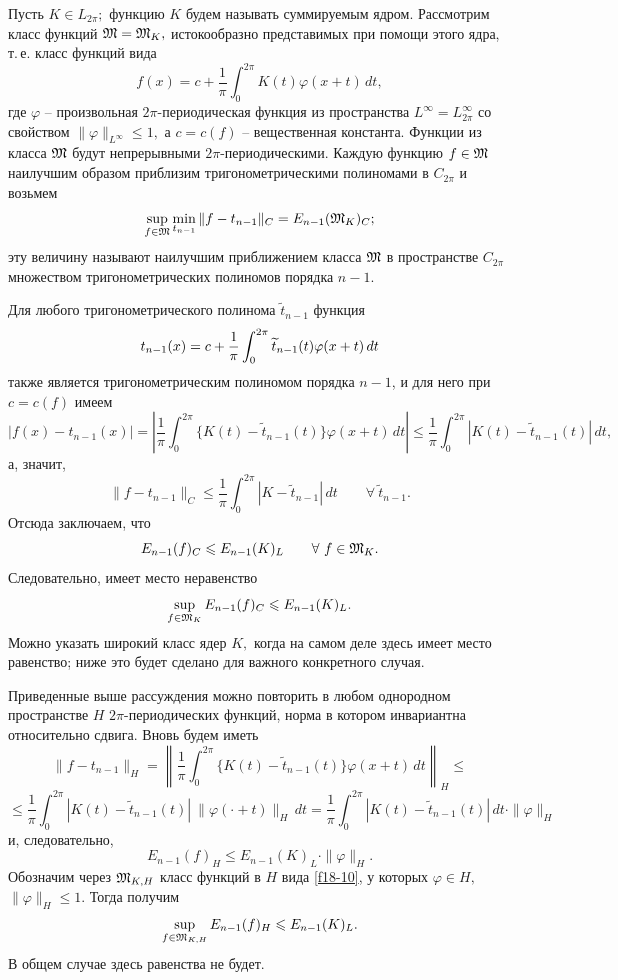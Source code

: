  Пусть  $K\in L_{2\pi};$ функцию $K$ будем называть  суммируемым  ядром.
 Рассмотрим класс функций $\mathfrak{M}=\mathfrak{M}_K,$  истокообразно представимых при помощи
 этого ядра, т.\,е. класс  функций вида
 \begin{equation}\label{f18-10}
 f(x)=c+\frac{1}{\pi}\int_0^{2\pi} K(t)\varphi(x+t)\,dt, %
 \end{equation}
 где  $\varphi$ -- произвольная $2\pi$-периодическая функция из пространства
 {$L^\infty=L_{2\pi}^{\infty}$}
 со свойством $\|\varphi\|_{{L^\infty}}\le 1,$ а $c=c(f)$ -- вещественная константа.
 Функции из класса $\mathfrak{M}$ будут непрерывными $2\pi$-периодическими. Каждую
  функцию $f\in \mathfrak{M}$
  наилучшим образом приблизим тригонометрическими
 полиномами в $C_{2\pi}$ и возьмем
 $$
 \sup_{f\in \mathfrak{M}} \min_{t_{n-1}}\|f-t_{n-1}\|_C=E_{n-1}(\mathfrak{M}_K)_C;
 $$
 эту величину называют наилучшим приближением класса $\mathfrak{M}$
 в пространстве $C_{2\pi}$ множеством
 тригонометрических полиномов порядка $n-1$.

 Для любого тригонометрического полинома {$\widetilde{t}_{n-1}$}  функция
 $$
 t_{n-1}(x)=c+ \frac{1}{\pi}\int_0^{2\pi} \-{\widetilde{t}_{n-1}(t)} \varphi(x+t)\, dt
 $$
также является тригонометрическим полиномом  порядка $n-1$, и для него при
$c=c(f)$ имеем
 $$
 |f(x)-t_{n-1}(x)|=\left| \frac{1}{\pi}\int_0^{2\pi} \{ K(t)-{\widetilde{t}_{n-1}(t)}\}
 \varphi(x+t)\, dt \right|\le \frac{1}{\pi}\int_0^{2\pi} | K(t)-{\widetilde{t}_{n-1}(t)}|\, dt,
 $$
а, значит,
 $$
 \|f-t_{n-1}\|_C\le \frac{1}{\pi}\int_0^{2\pi} |K-{\widetilde{t}_{n-1}}|\,
 dt \qquad \forall \ {\widetilde{t}_{n-1}}.
 $$
 Отсюда заключаем, что
 $$
 E_{n-1}(f)_C\leqslant E_{n-1}(K)_L\qquad \forall \ f\in \mathfrak{M}_K.
 $$
 Следовательно, имеет место неравенство
 \begin{equation}\label{f18-11}
 \sup_{f\in \G M_K} E_{n-1}(f)_C \le E_{n-1}(K)_L. %
 \end{equation}
{Можно указать широкий класс ядер $K,$ когда на самом деле здесь имеет место равенство;
ниже это будет сделано для важного конкретного случая.}

 Приведенные выше рассуждения можно повторить в любом однородном
 пространстве $H$ $2\pi$-периодических функций, норма в котором инвариантна относительно сдвига.
 Вновь будем  иметь
 $$
 \|f-t_{n-1}\|_H=\left\| \frac{1}{\pi}\int_0^{2\pi}\{K(t)-{\widetilde{t}_{n-1}(t)}\}
 \varphi(x+t)\, dt\right\|_H\le
 $$
 $$
 \le \frac{1}{\pi}\int_0^{2\pi} |K(t)-{\widetilde{t}_{n-1}(t)}|\ \|\varphi(\cdot +t)\|_H\, dt=
 \frac{1}{\pi}\int_0^{2\pi} |K(t)-{\widetilde{t}_{n-1}(t)}|\, dt \cdot \|\varphi\|_H
 $$
 и, следовательно,
 $$
 E_{n-1}(f)_H \le E_{n-1}(K)_L\cdot \|\varphi\|_H.
 $$
 Обозначим через  $\mathfrak{M}_{K,H}$ класс функций в $H$ вида {\eqref{f18-10}},
 у  которых $\varphi\in H,$~ $\|\varphi\|_H\le 1.$ Тогда получим
 $$
 \sup_{f\in \mathfrak{M}_{K,H}} E_{n-1}(f)_H\leqslant E_{n-1}(K)_L.
 $$
 В общем случае здесь равенства не будет.

